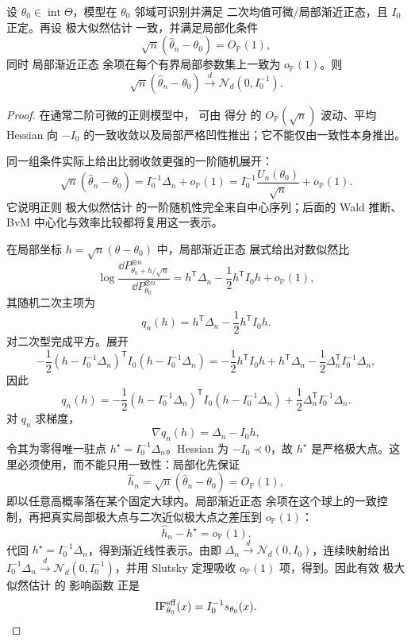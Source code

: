 \begin{theorem}\label{thm:math-stat-mle-asymptotic-normal}
设 $\theta_0\in\operatorname{int}\Theta$，模型在 $\theta_0$ 邻域可识别并满足 二次均值可微/局部渐近正态，且 $I_0$ 正定。再设 极大似然估计 一致，并满足局部化条件
\begin{equation}\label{eq:math-stat-mle-rootn-localization}
 \sqrt n(\widehat\theta_n-\theta_0)=O_{\mathbb P}(1),
\end{equation}
同时 局部渐近正态 余项在每个有界局部参数集上一致为 $o_{\mathbb P}(1)$。则
\begin{equation}\label{eq:math-stat-mle-asymptotic-normal}
 \sqrt n(\widehat\theta_n-\theta_0)
 \xrightarrow{d}\mathcal N_d(0,I_0^{-1}).
\end{equation}
\end{theorem}
\begin{proof}
在通常二阶可微的正则模型中， 可由 得分 的 $O_{\mathbb P}(\sqrt n)$ 波动、平均 Hessian 向 $-I_0$ 的一致收敛以及局部严格凹性推出；它不能仅由一致性本身推出。

同一组条件实际上给出比弱收敛更强的一阶随机展开：
\begin{equation}\label{eq:math-stat-mle-score-representation}
 \sqrt n(\widehat\theta_n-\theta_0)
 =I_0^{-1}\Delta_n+o_{\mathbb P}(1)
 =I_0^{-1}\frac{U_n(\theta_0)}{\sqrt n}+o_{\mathbb P}(1).
\end{equation}
它说明正则 极大似然估计 的一阶随机性完全来自中心序列；后面的 Wald 推断、BvM 中心化与效率比较都将复用这一表示。

在局部坐标 $h=\sqrt n(\theta-\theta_0)$ 中，局部渐近正态 展式给出对数似然比
\[
 \log\frac{\dd P_{\theta_0+h/\sqrt n}^{\otimes n}}{\dd P_{\theta_0}^{\otimes n}}
 =h^{\mathsf T}\Delta_n-\frac12h^{\mathsf T}I_0h+o_{\mathbb P}(1),
\]
其随机二次主项为
\[
 q_n(h)
 =h^{\mathsf T}\Delta_n-\frac12h^{\mathsf T}I_0h.
\]
对二次型完成平方。展开
\[
 -\frac12(h-I_0^{-1}\Delta_n)^{\mathsf T}I_0(h-I_0^{-1}\Delta_n)
 =-\frac12h^{\mathsf T}I_0h+h^{\mathsf T}\Delta_n-\frac12\Delta_n^{\mathsf T}I_0^{-1}\Delta_n,
\]
因此
\[
 q_n(h)
 =-\frac12(h-I_0^{-1}\Delta_n)^{\mathsf T}
 I_0(h-I_0^{-1}\Delta_n)
 +\frac12\Delta_n^{\mathsf T}I_0^{-1}\Delta_n.
\]
对 $q_n$ 求梯度，
\[
 \nabla q_n(h)=\Delta_n-I_0h,
\]
令其为零得唯一驻点 $h^\star=I_0^{-1}\Delta_n$。Hessian 为 $-I_0\prec0$，故 $h^\star$ 是严格极大点。这里必须使用，而不能只用一致性：局部化先保证
\[
 \widehat h_n=\sqrt n(\widehat\theta_n-\theta_0)=O_{\mathbb P}(1),
\]
即以任意高概率落在某个固定大球内。局部渐近正态 余项在这个球上的一致控制，再把真实局部极大点与二次近似极大点之差压到 $o_{\mathbb P}(1)$：
\[
 \widehat h_n-h^\star=o_{\mathbb P}(1).
\]
代回 $h^\star=I_0^{-1}\Delta_n$，得到渐近线性表示。由即 $\Delta_n\xrightarrow{d}\mathcal N_d(0,I_0)$，连续映射给出 $I_0^{-1}\Delta_n\xrightarrow{d}\mathcal N_d(0,I_0^{-1})$，并用 Slutsky 定理吸收 $o_{\mathbb P}(1)$ 项，得到。因此有效 极大似然估计 的 影响函数 正是
\[
 \mathrm{IF}_{\theta_0}^{\rm eff}(x)
 =I_0^{-1}s_{\theta_0}(x).
\]
\end{proof}



